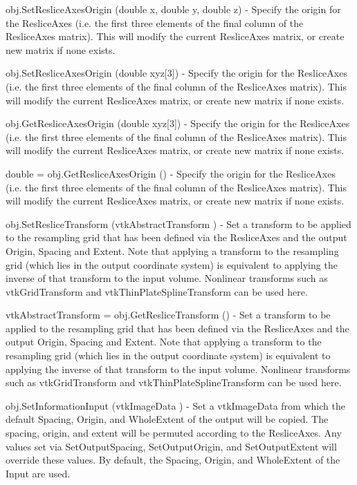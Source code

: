 \begin{DoxyItemize}
\item {\ttfamily obj.\-Set\-Reslice\-Axes\-Origin (double x, double y, double z)} -\/ Specify the origin for the Reslice\-Axes (i.\-e. the first three elements of the final column of the Reslice\-Axes matrix). This will modify the current Reslice\-Axes matrix, or create new matrix if none exists.  
\item {\ttfamily obj.\-Set\-Reslice\-Axes\-Origin (double xyz\mbox{[}3\mbox{]})} -\/ Specify the origin for the Reslice\-Axes (i.\-e. the first three elements of the final column of the Reslice\-Axes matrix). This will modify the current Reslice\-Axes matrix, or create new matrix if none exists.  
\item {\ttfamily obj.\-Get\-Reslice\-Axes\-Origin (double xyz\mbox{[}3\mbox{]})} -\/ Specify the origin for the Reslice\-Axes (i.\-e. the first three elements of the final column of the Reslice\-Axes matrix). This will modify the current Reslice\-Axes matrix, or create new matrix if none exists.  
\item {\ttfamily double = obj.\-Get\-Reslice\-Axes\-Origin ()} -\/ Specify the origin for the Reslice\-Axes (i.\-e. the first three elements of the final column of the Reslice\-Axes matrix). This will modify the current Reslice\-Axes matrix, or create new matrix if none exists.  
\item {\ttfamily obj.\-Set\-Reslice\-Transform (vtk\-Abstract\-Transform )} -\/ Set a transform to be applied to the resampling grid that has been defined via the Reslice\-Axes and the output Origin, Spacing and Extent. Note that applying a transform to the resampling grid (which lies in the output coordinate system) is equivalent to applying the inverse of that transform to the input volume. Nonlinear transforms such as vtk\-Grid\-Transform and vtk\-Thin\-Plate\-Spline\-Transform can be used here.  
\item {\ttfamily vtk\-Abstract\-Transform = obj.\-Get\-Reslice\-Transform ()} -\/ Set a transform to be applied to the resampling grid that has been defined via the Reslice\-Axes and the output Origin, Spacing and Extent. Note that applying a transform to the resampling grid (which lies in the output coordinate system) is equivalent to applying the inverse of that transform to the input volume. Nonlinear transforms such as vtk\-Grid\-Transform and vtk\-Thin\-Plate\-Spline\-Transform can be used here.  
\item {\ttfamily obj.\-Set\-Information\-Input (vtk\-Image\-Data )} -\/ Set a vtk\-Image\-Data from which the default Spacing, Origin, and Whole\-Extent of the output will be copied. The spacing, origin, and extent will be permuted according to the Reslice\-Axes. Any values set via Set\-Output\-Spacing, Set\-Output\-Origin, and Set\-Output\-Extent will override these values. By default, the Spacing, Origin, and Whole\-Extent of the Input are used.  

\end{DoxyItemize}
